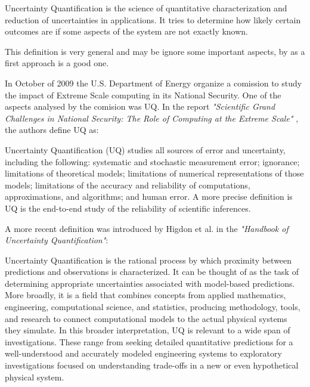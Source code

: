 \begin{defn}
Uncertainty Quantification is the science of quantitative characterization and reduction of uncertainties in applications. It tries to determine how likely certain outcomes are if some aspects of the system are not exactly known.
\end{defn}

This definition is very general and may be ignore some important aspects, by as a first approach is a good one. 

In October of 2009 the U.S. Department of Energy organize a comission to study the impact of Extreme Scale computing in its National Security. One of the aspects analysed by the comision was UQ. In the report \textit{"Scientific Grand Challenges in National Security: The Role of Computing at the Extreme Scale"} \cite{DEnergy2009}, the authors define UQ as:

\begin{defn}
Uncertainty Quantification (UQ) studies all sources of error and uncertainty, including the following:  
systematic and stochastic measurement error; ignorance; limitations of theoretical models; limitations of 
numerical representations of those models; limitations of the accuracy and reliability of computations, 
approximations, and algorithms; and human error. A more precise definition is UQ is the end-to-end 
study of the reliability of scientific inferences. \cite{DEnergy2009}
\end{defn}

A more recent definition was introduced by Higdon et al. \cite{Higdon2017} in the \textit{"Handbook of Uncertainty Quantification"}:

\begin{defn}
Uncertainty Quantification is the rational process by which proximity between predictions and observations is characterized. It can be thought of as the task of determining appropriate uncertainties associated with model-based predictions. More broadly, it is a field that combines concepts from applied mathematics, engineering, computational science, and statistics, producing methodology, tools, and research to connect computational models to the actual physical systems they simulate. In this broader interpretation, UQ is relevant to a wide span of investigations. These range from seeking detailed quantitative predictions for a well-understood and accurately modeled engineering systems to exploratory investigations focused on understanding trade-offs in a new or even hypothetical physical system. \cite{Higdon2017}
\end{defn}

